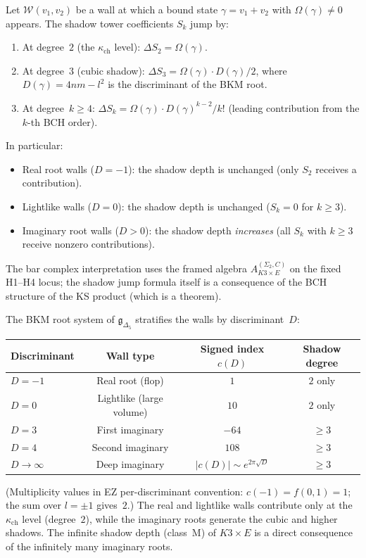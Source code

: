 \begin{proposition}
\label{prop:k3e-shadow-jump}
Let $\mathcal{W}(v_1, v_2)$ be a wall at which a bound state $\gamma = v_1 + v_2$ with $\Omega(\gamma) \neq 0$ appears. The shadow tower coefficients $S_k$ jump by:
\begin{enumerate}[label=(\roman*)]
 \item At degree~$2$ (the $\kappa_{\mathrm{ch}}$ level): $\Delta S_2 = \Omega(\gamma)$.
 \item At degree~$3$ (cubic shadow): $\Delta S_3 = \Omega(\gamma) \cdot D(\gamma)/2$, where $D(\gamma) = 4nm - l^2$ is the discriminant of the BKM root.
 \item At degree~$k \geq 4$: $\Delta S_k = \Omega(\gamma) \cdot D(\gamma)^{k-2}/k!$ (leading contribution from the $k$-th BCH order).
\end{enumerate}
In particular:
\begin{itemize}
 \item Real root walls ($D = -1$): the shadow depth is unchanged (only $S_2$ receives a contribution).
 \item Lightlike walls ($D = 0$): the shadow depth is unchanged ($S_k = 0$ for $k \geq 3$).
 \item Imaginary root walls ($D > 0$): the shadow depth \emph{increases} (all $S_k$ with $k \geq 3$ receive nonzero contributions).
\end{itemize}
The bar complex interpretation uses the framed algebra $A_{K3 \times E}^{(\Sigma_2,C)}$ on the fixed H1--H4 locus; the shadow jump formula itself is a consequence of the BCH structure of the KS product (which is a theorem).
\end{proposition}

\begin{remark}
\label{rem:k3e-disc-strat}
The BKM root system of $\mathfrak{g}_{\Delta_5}$ stratifies the walls by discriminant~$D$:
\begin{center}
\renewcommand{\arraystretch}{1.2}
\begin{tabular}{@{}lccc@{}}
\textbf{Discriminant} & \textbf{Wall type} & \textbf{Signed index $c(D)$} & \textbf{Shadow degree} \\ \hline
$D = -1$ & Real root (flop) & $1$ & $2$ only \\
$D = 0$ & Lightlike (large volume) & $10$ & $2$ only \\
$D = 3$ & First imaginary & $-64$ & $\geq 3$ \\
$D = 4$ & Second imaginary & $108$ & $\geq 3$ \\
$D \to \infty$ & Deep imaginary & $|c(D)| \sim e^{2\pi\sqrt{D}}$ & $\geq 3$
\end{tabular}
\end{center}
(Multiplicity values in EZ per-discriminant convention: $c(-1) = f(0,1) = 1$; the sum over $l = \pm 1$ gives~$2$.)
The real and lightlike walls contribute only at the $\kappa_{\mathrm{ch}}$ level (degree~$2$), while the imaginary roots generate the cubic and higher shadows. The infinite shadow depth (class~M) of $K3 \times E$ is a direct consequence of the infinitely many imaginary roots.
\end{remark}

